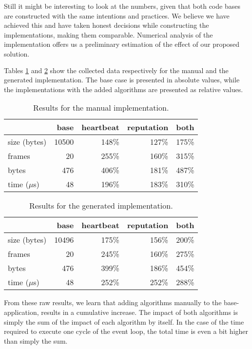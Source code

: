 \documentclass[conference]{IEEEtran}
\begin{document}
Still it might be interesting to look at the numbers, given that both code
bases are constructed with the same intentions and practices. We believe we
have achieved this and have taken honest decisions while constructing the
implementations, making them comparable. Numerical analysis of the
implementation offers us a preliminary estimation of the effect of our proposed
solution.

Tables \ref{tbl:manual} and \ref{tbl:generated} show the collected data
respectively for the manual and the generated implementation. The base case is
presented in absolute values, while the implementations with the added
algorithms are presented as relative values.

\begin{table}[H]
  \centering
  \begin{tabular}{lrrrr}
  \hline
      & base & heartbeat & reputation & both\\
  \hline
  size (bytes) & 10500 & 148\% & 127\% & 175\%\\
  frames & 20 & 255\% & 160\% & 315\%\\
  bytes & 476 & 406\% & 181\% & 487\%\\
  time ($\mu$s) & 48 & 196\% & 183\% & 310\%\\
  \hline
  \end{tabular}
  \caption{Results for the manual implementation.}
  \label{tbl:manual}
\end{table}

\begin{table}[H]
  \centering
  \begin{tabular}{lrrrr}
  \hline
         & base & heartbeat & reputation & both\\
  \hline
  size (bytes) & 10496 & 175\% & 156\% & 200\%\\
  frames & 20 & 245\% & 160\% & 275\%\\
  bytes & 476 & 399\% & 186\% & 454\%\\
  time ($\mu$s) & 48 & 252\% & 252\% & 288\%\\
  \hline
  \end{tabular}
  \caption{Results for the generated implementation.}
  \label{tbl:generated}
\end{table}

From these raw results, we learn that adding algorithms manually to the
base-application, results in a cumulative increase. The impact of both
algorithms is simply the sum of the impact of each algorithm by itself. In the
case of the time required to execute one cycle of the event loop, the total
time is even a bit higher than simply the sum.
\end{document}
